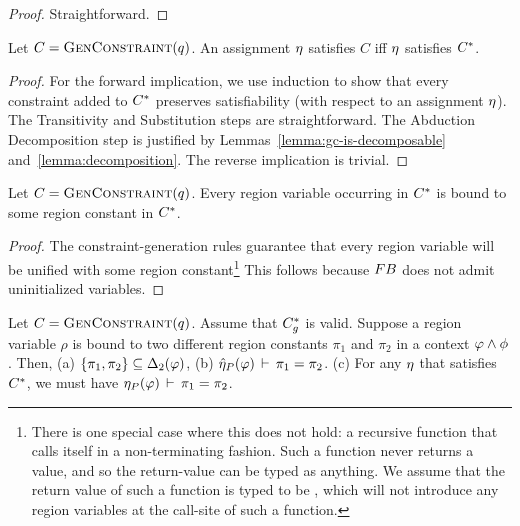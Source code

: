 \begin{proof}
  Straightforward.
\end{proof}

\begin{theorem}
  \label{thm:closure}
Let $C = \textsc{GenConstraint}(q)$.
An assignment $\eta$ satisfies $C$ iff $\eta$ satisfies ${C}^*$.
\end{theorem}

\begin{proof}
  For the forward implication, we use induction to show that every constraint
  added to ${C}^*$ preserves satisfiability (with respect to an assignment $\eta$).
  The Transitivity and Substitution steps are straightforward. The Abduction Decomposition
  step is justified by Lemmas~\ref{lemma:gc-is-decomposable} and~\ref{lemma:decomposition}.
  The reverse implication is trivial.
\end{proof}

\begin{lemma}
  \label{lemma:completely-bound}
Let $C = \textsc{GenConstraint}(q)$.
Every region variable occurring in ${C}^*$ is bound to some region constant in ${C}^*$.
\end{lemma}

\begin{proof}
The constraint-generation rules guarantee that every region variable will
be unified with some region constant\footnote{
There is one special case where this does not hold: a recursive function
that calls itself in a non-terminating fashion. Such a function never
returns a value, and so the return-value can be typed as anything.
We assume that the return value of such a function is typed to be ,
which will not introduce any region variables at the call-site of such a function.}
This follows because ${\sc FB}$ does not admit uninitialized variables.
\end{proof}

\begin{lemma}
  \label{lemma:two-bindings}
Let $C = \textsc{GenConstraint}(q)$. Assume that ${C}^*_g$ is valid.
Suppose a region variable $\rho$ is bound to two different region constants $\pi_1$
and $\pi_2$ in a context $\varphi \wedge \phi$. %
Then, 
(a) $\{ \pi_1, \pi_2 \} \subseteq {\Delta_2}(\varphi)$,
(b) $\hat{\eta}_P(\varphi)\,\vdash\,\pi_1 = \pi_2$.
(c) For any $\eta$ that satisfies ${C}^*$, we must have $\eta_P(\varphi)\,\vdash\,\pi_1 = \pi_2$.
\end{lemma}

